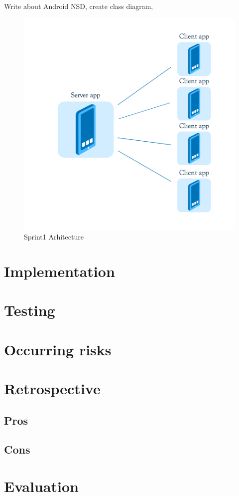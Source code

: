 Write about Android NSD, create class diagram, 


\begin{figure}[!t]
	\centering
		\includegraphics[width=16cm]{sprint1/arhitecture.png}
	\caption{Sprint1 Arhitecture}
	\label{fig:sprint1_arhitecture}
\end{figure}

\section{Implementation}
\section{Testing}
\section{Occurring risks}
\section{Retrospective}
\subsection{Pros}
\subsection{Cons}
\section{Evaluation}
